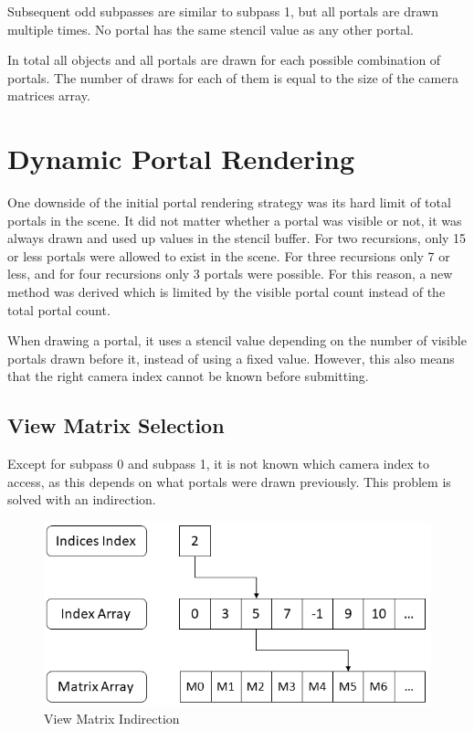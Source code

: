 Subsequent odd subpasses are similar to subpass 1, but all portals are drawn multiple times. No portal has the same stencil value as any other portal.

In total all objects and all portals are drawn for each possible combination of portals. The number of draws for each of them is equal to the size of the camera matrices array.


\section{Dynamic Portal Rendering}
One downside of the initial portal rendering strategy was its hard limit of total portals in the scene. It did not matter whether a portal was visible or not, it was always drawn and used up values in the stencil buffer. For two recursions, only 15 or less portals were allowed to exist in the scene. For three recursions only 7 or less, and for four recursions only 3 portals were possible. For this reason, a new method was derived which is limited by the visible portal count instead of the total portal count. 

When drawing a portal, it uses a stencil value depending on the number of visible portals drawn before it, instead of using a fixed value. However, this also means that the right camera index cannot be known before submitting.


\subsection{View Matrix Selection}
\label{section:viewmatrixselection}
Except for subpass 0 and subpass 1, it is not known which camera index to access, as this depends on what portals were drawn previously. This problem is solved with an indirection.

\begin{figure}[h]
	\includegraphics[width=\linewidth]{images/viewmatrixindirection.png}
	\caption{View Matrix Indirection}
	\label{fig:viewmatrixindirection}
\end{figure}

